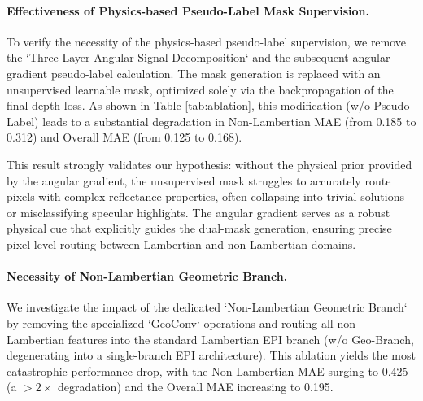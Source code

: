 \documentclass[lettersize,journal]{IEEEtran}
\begin{document}
\begin{table}[htbp]
\caption{Ablation Study of Key Modules in the Proposed Unified Dual-Mask Physical Model. Lower is better for all metrics.}
\label{tab:ablation}
\centering
{}
\end{table}

\paragraph{Effectiveness of Physics-based Pseudo-Label Mask Supervision.}
To verify the necessity of the physics-based pseudo-label supervision, we remove the `Three-Layer Angular Signal Decomposition` and the subsequent angular gradient pseudo-label calculation. The mask generation is replaced with an unsupervised learnable mask, optimized solely via the backpropagation of the final depth loss. As shown in Table \ref{tab:ablation}, this modification (w/o Pseudo-Label) leads to a substantial degradation in Non-Lambertian MAE (from 0.185 to 0.312) and Overall MAE (from 0.125 to 0.168). 

This result strongly validates our hypothesis: without the physical prior provided by the angular gradient, the unsupervised mask struggles to accurately route pixels with complex reflectance properties, often collapsing into trivial solutions or misclassifying specular highlights. The angular gradient serves as a robust physical cue that explicitly guides the dual-mask generation, ensuring precise pixel-level routing between Lambertian and non-Lambertian domains.

\paragraph{Necessity of Non-Lambertian Geometric Branch.}
We investigate the impact of the dedicated `Non-Lambertian Geometric Branch` by removing the specialized `GeoConv` operations and routing all non-Lambertian features into the standard Lambertian EPI branch (w/o Geo-Branch, degenerating into a single-branch EPI architecture). This ablation yields the most catastrophic performance drop, with the Non-Lambertian MAE surging to 0.425 (a $>2\times$ degradation) and the Overall MAE increasing to 0.195. 
\end{document}
